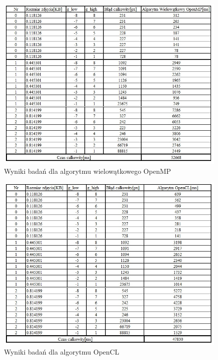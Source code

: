 \documentclass[document.tex]{subfiles}
\begin{document}
\begin{figure}[h]
\includegraphics[scale=0.75]{imgs/results_pc_openmp_threads.jpg}
\caption{Wyniki badań dla algorytmu wielowątkowego OpenMP}
\label{fig:results_pc_openmp_threads}
\end{figure}

\begin{figure}[h]
\includegraphics[scale=0.75]{imgs/results_pc_gpu.jpg}
\caption{Wyniki badań dla algorytmu OpenCL}
\label{fig:results_pc_gpu}
\end{figure}
\end{document}
